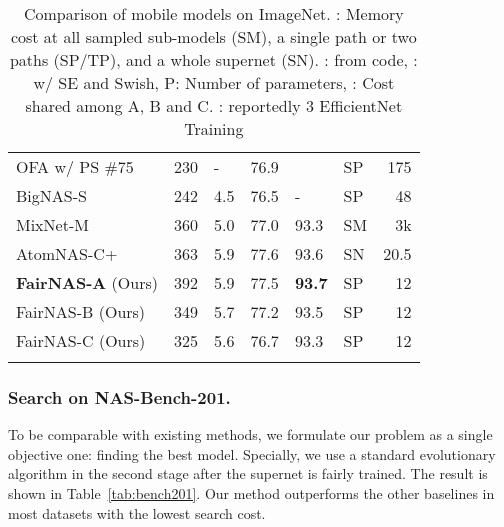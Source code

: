 \documentclass[10pt,twocolumn,letterpaper]{article}
\theoremstyle{definition}
\begin{document}
\begin{table}
\begin{small}
\begin{tabular}{|l|l|l|l|Hl|r|}
			 OFA w/ PS \#75 \cite{cai2019once} & 230 & - & 76.9 & & SP & 175 \\
			 BigNAS-S \cite{yu2020bignas} &  242 & 4.5 & 76.5 & - & SP & ~48 \\
			 MixNet-M \cite{tan2020mixconv} &360 & 5.0 & 77.0 & 93.3 & SM &3k\\
			 AtomNAS-C+ \cite{Mei2020AtomNAS:} & 363 & 5.9 & 77.6 & 93.6 & SN & 20.5 \\
			 \textbf{FairNAS-A} (Ours) & 392& 5.9& 77.5& \textbf{93.7} &  SP & 12 \\ 
			 FairNAS-B (Ours) & 349& 5.7 &77.2 & 93.5 &  SP & 12  \\
			 FairNAS-C (Ours) & 325& 5.6 &76.7 & 93.3 & SP & 12 \\
			\hline
			\noalign{\smallskip\smallskip}
\end{tabular}
		\end{small}
	\caption{Comparison of mobile models on ImageNet. : Memory cost at all sampled sub-models (SM), a single path or two paths (SP/TP), and a whole supernet (SN). : from code,  : w/ SE and Swish, P: Number of parameters, : Cost shared among A, B and C. : reportedly 3 EfficientNet Training } \label{tab:comparison-imagenet}
\end{table}






\subsubsection{Search on NAS-Bench-201.}
To be comparable with existing methods, we formulate our problem as a single objective one: finding the best model. Specially, we use a standard evolutionary algorithm in the second stage after the supernet is fairly trained. The result is shown in Table~\ref{tab:bench201}. Our method outperforms the other baselines in most datasets with the lowest search cost.  
\end{document}

